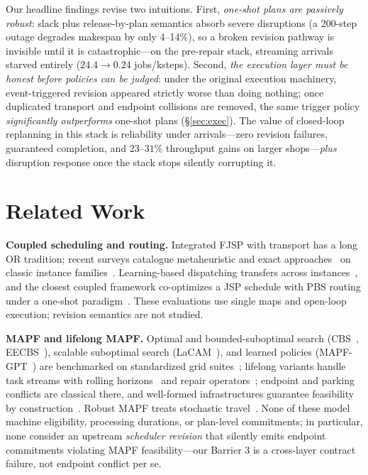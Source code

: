 \documentclass[twocolumn]{article}
\begin{document}
Our headline findings revise two intuitions. First, \emph{one-shot plans
are passively robust}: slack plus release-by-plan semantics absorb severe
disruptions (a 200-step outage degrades makespan by only 4--14\%),
so a broken revision pathway is invisible until it is
catastrophic---on the pre-repair stack, streaming arrivals starved
entirely ($24.4\to0.24$ jobs/ksteps). Second, \emph{the execution layer
must be honest before policies can be judged}: under the original
execution machinery, event-triggered revision appeared strictly worse
than doing nothing; once duplicated transport and endpoint collisions
are removed, the same trigger policy \emph{significantly outperforms}
one-shot plans (\S\ref{sec:exec}). The value of closed-loop replanning
in this stack is reliability under arrivals---zero revision failures,
guaranteed completion, and $23$--$31\%$ throughput gains on larger
shops---\emph{plus} disruption response once the stack stops silently
corrupting it.

\section{Related Work}
\textbf{Coupled scheduling and routing.} Integrated FJSP with transport
has a long OR tradition; recent surveys catalogue metaheuristic and
exact approaches~\cite{xin2025fjsppt,dauzere2024fjsp} on classic
instance families~\cite{brandimarte1993routing}. Learning-based
dispatching transfers across
instances~\cite{zhang2020l2d,smit2025gnn}, and the closest coupled
framework co-optimizes a JSP schedule with PBS routing under a
one-shot paradigm~\cite{li2026framework}. These evaluations use single
maps and open-loop execution; revision semantics are not studied.

\textbf{MAPF and lifelong MAPF.} Optimal and bounded-suboptimal search
(CBS~\cite{sharon2015cbs}, EECBS~\cite{li2021eecbs}), scalable
suboptimal search (LaCAM~\cite{okumura2023lacam}), and learned policies
(MAPF-GPT~\cite{andreychuk2025mapfgpt}) are benchmarked on standardized
grid suites~\cite{skrynnik2024pogema}; lifelong variants handle task
streams with rolling horizons~\cite{ma2017mapd,li2021rhcr} and repair
operators~\cite{li2022lns2}; endpoint and parking conflicts are
classical there, and well-formed infrastructures guarantee feasibility
by construction~\cite{wurman2008coordinating}. Robust MAPF treats
stochastic travel~\cite{vanderwedden2020sttcbs}. None of these model
machine eligibility, processing durations, or plan-level commitments;
in particular, none consider an upstream \emph{scheduler revision}
that silently emits endpoint commitments violating MAPF
feasibility---our Barrier 3 is a cross-layer contract failure, not
endpoint conflict per se.
\end{document}
